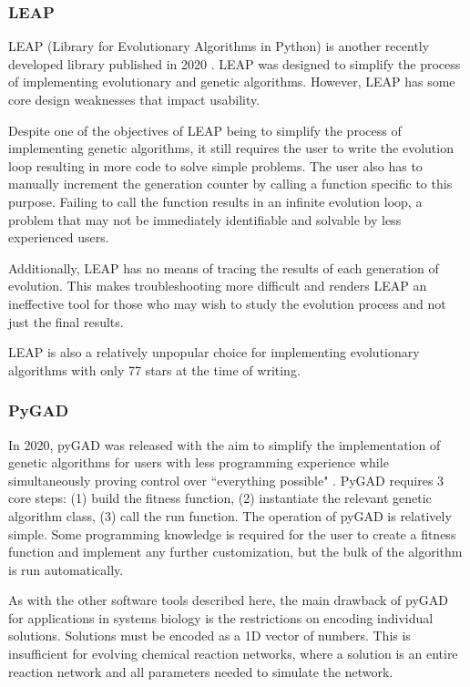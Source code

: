 \documentclass[12pt]{report}
\begin{document}
\subsubsection{LEAP}
LEAP (Library for Evolutionary Algorithms in Python) is another recently developed library published in 2020 \cite{LEAP}. LEAP was designed to simplify the process of implementing evolutionary and genetic algorithms. However, LEAP has some core design weaknesses that impact usability. 

Despite one of the objectives of LEAP being to simplify the process of implementing genetic algorithms, it still requires the user to write the evolution loop resulting in more code to solve simple problems. The user also has to manually increment the generation counter by calling a function specific to this purpose. Failing to call the function results in an infinite evolution loop, a problem that may not be immediately identifiable and solvable by less experienced users.

Additionally, LEAP has no means of tracing the results of each generation of evolution. This makes troubleshooting more difficult and renders LEAP an ineffective tool for those who may wish to study the evolution process and not just the final results.

LEAP is also a relatively unpopular choice for implementing evolutionary algorithms with only 77 stars at the time of writing.

\subsubsection{PyGAD}
In 2020, pyGAD was released with the aim to simplify the implementation of genetic algorithms for users with less programming experience while simultaneously proving control over ``everything possible" \cite{gad2023pygad}. PyGAD requires 3 core steps: (1) build the fitness function, (2) instantiate the relevant genetic algorithm class, (3) call the run function. The operation of pyGAD is relatively simple. Some programming knowledge is required for the user to create a fitness function and implement any further customization, but the bulk of the algorithm is run automatically. 

As with the other software tools described here, the main drawback of pyGAD for applications in systems biology is the restrictions on encoding individual solutions. Solutions must be encoded as a 1D vector of numbers. This is insufficient for evolving chemical reaction networks, where a solution is an entire reaction network and all parameters needed to simulate the network.
\end{document}
